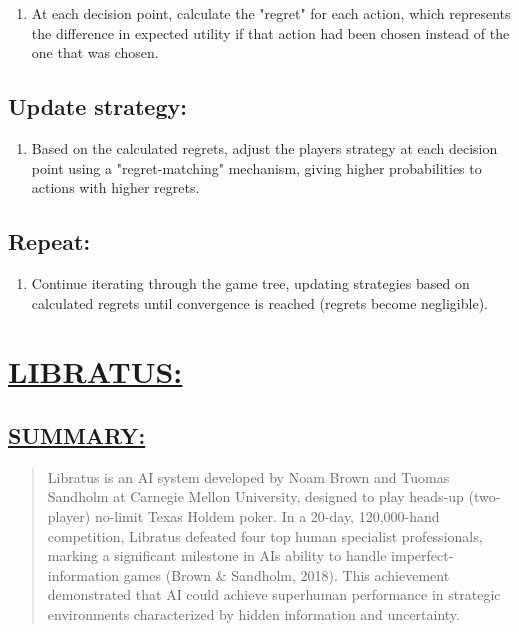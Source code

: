 \documentclass[
]{article}
\begin{document}
\begin{enumerate}
\def\labelenumi{\alph{enumi}.}
\setcounter{enumi}{2}
\item
  At each decision point, calculate the "regret" for each action, which
  represents the difference in expected utility if that action had been
  chosen instead of the one that was chosen.
\end{enumerate}

\subsection{Update strategy:}\label{update-strategy}

\begin{enumerate}
\def\labelenumi{\alph{enumi}.}
\setcounter{enumi}{3}
\item
  Based on the calculated regrets, adjust the player\textquotesingle s
  strategy at each decision point using a "regret-matching" mechanism,
  giving higher probabilities to actions with higher regrets.
\end{enumerate}

\subsection{Repeat:}\label{repeat}

\begin{enumerate}
\def\labelenumi{\alph{enumi}.}
\setcounter{enumi}{4}
\item
  Continue iterating through the game tree, updating strategies based on
  calculated regrets until convergence is reached (regrets become
  negligible).
\end{enumerate}

\section*{\texorpdfstring{\textbf{\ul{LIBRATUS:}}}{LIBRATUS:}}\label{libratus}

\subsection*{\texorpdfstring{\textbf{\ul{SUMMARY:}}}{SUMMARY:}}\label{summary}

\begin{quote}
Libratus is an AI system developed by Noam Brown and Tuomas Sandholm at
Carnegie Mellon University, designed to play heads-up (two-player)
no-limit Texas Hold\textquotesingle em poker. In a 20-day, 120,000-hand
competition, Libratus defeated four top human specialist professionals,
marking a significant milestone in AI\textquotesingle s ability to
handle imperfect-information games (Brown \& Sandholm, 2018). This
achievement demonstrated that AI could achieve superhuman performance in
strategic environments characterized by hidden information and
uncertainty.
\end{quote}
\end{document}
